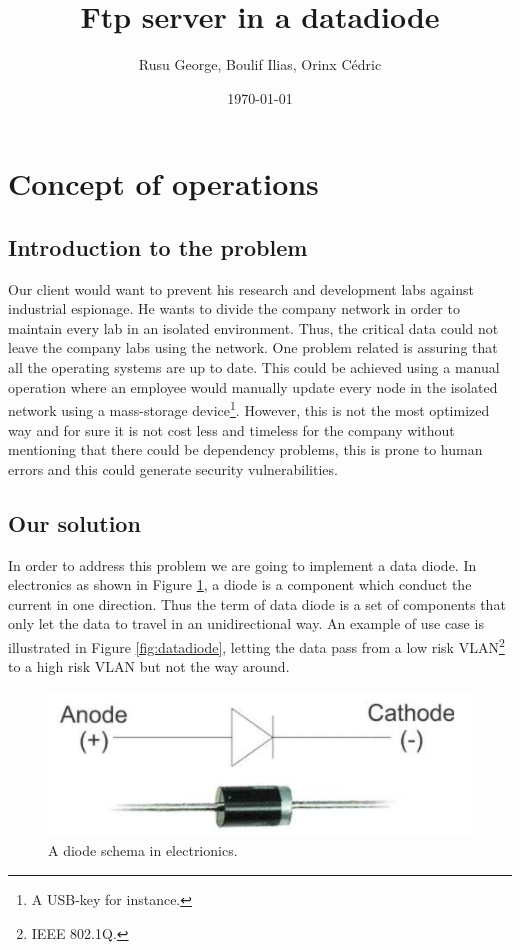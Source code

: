 \documentclass[a4paper,10pt]{article}
\title{Ftp server in a datadiode}
\author{Rusu George, Boulif Ilias, Orinx Cédric}
\date{\today}
\begin{document}
\maketitle
\newpage
\tableofcontents
\newpage
\section{Concept of operations}
\subsection{Introduction to the problem}
Our client would want to prevent his research and development labs against industrial espionage. He wants to divide the company network in order to maintain every lab in an isolated environment. Thus, the critical data could not leave the company labs using the network. One problem related is assuring that all the operating systems are up to date. This could be achieved using a manual operation where an employee would manually update every node in the isolated network using a mass-storage device\footnote{A USB-key for instance.}. However, this is not the most optimized way and for sure it is not cost less and timeless for the company without mentioning that there could be dependency problems, this is prone to human errors and this could generate security vulnerabilities.

\subsection{Our solution}
In order to address this problem we are going to implement a data diode. In electronics as shown in Figure \ref{fig:diode}, a diode is a component which conduct the current in one direction. Thus the term of data diode is a set of components that only let the data to travel in an unidirectional way. An example of use case is illustrated in Figure \ref{fig:datadiode}, letting the data pass from a low risk VLAN\footnote{IEEE 802.1Q.} to a high risk VLAN but not the way around.
\begin{figure}
\centering
\includegraphics[scale=0.25]{images/diode.png}
\caption{A diode schema in electrionics.}
\label{fig:diode}
\end{figure}
\end{document}
